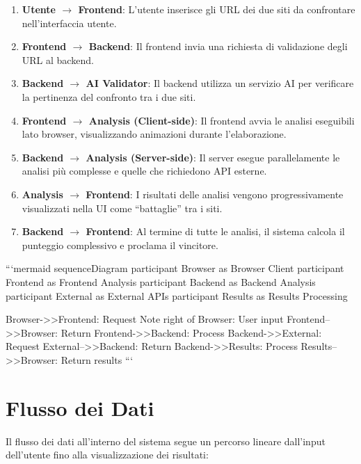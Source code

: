 \begin{enumerate}
    \item \textbf{Utente $\rightarrow$ Frontend}: L'utente inserisce gli URL dei due siti da confrontare nell'interfaccia utente.
    
    \item \textbf{Frontend $\rightarrow$ Backend}: Il frontend invia una richiesta di validazione degli URL al backend.
    
    \item \textbf{Backend $\rightarrow$ AI Validator}: Il backend utilizza un servizio AI per verificare la pertinenza del confronto tra i due siti.
    
    \item \textbf{Frontend $\rightarrow$ Analysis (Client-side)}: Il frontend avvia le analisi eseguibili lato browser, visualizzando animazioni durante l'elaborazione.
    
    \item \textbf{Backend $\rightarrow$ Analysis (Server-side)}: Il server esegue parallelamente le analisi più complesse e quelle che richiedono API esterne.
    
    \item \textbf{Analysis $\rightarrow$ Frontend}: I risultati delle analisi vengono progressivamente visualizzati nella UI come ``battaglie'' tra i siti.
    
    \item \textbf{Backend $\rightarrow$ Frontend}: Al termine di tutte le analisi, il sistema calcola il punteggio complessivo e proclama il vincitore.
\end{enumerate}

```mermaid
sequenceDiagram
    participant Browser as Browser Client
    participant Frontend as Frontend Analysis
    participant Backend as Backend Analysis
    participant External as External APIs
    participant Results as Results Processing
    
    Browser->>Frontend: Request
    Note right of Browser: User input
    Frontend-->>Browser: Return
    Frontend->>Backend: Process
    Backend->>External: Request
    External-->>Backend: Return
    Backend->>Results: Process
    Results-->>Browser: Return results
```

\section{Flusso dei Dati}
Il flusso dei dati all'interno del sistema segue un percorso lineare dall'input dell'utente fino alla visualizzazione dei risultati:

